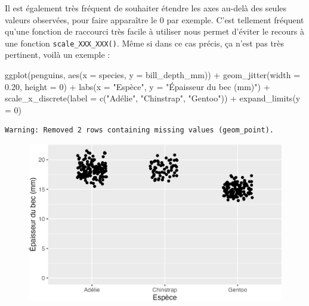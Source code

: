 \documentclass[
  letterpaper,
  DIV=11,
  numbers=noendperiod]{scrreprt}
\newenvironment{Shaded}{\begin{snugshade}}{\end{snugshade}}
\newcommand{\AttributeTok}[1]{\textcolor[rgb]{0.40,0.45,0.13}{#1}}
\newcommand{\DecValTok}[1]{\textcolor[rgb]{0.68,0.00,0.00}{#1}}
\newcommand{\FloatTok}[1]{\textcolor[rgb]{0.68,0.00,0.00}{#1}}
\newcommand{\FunctionTok}[1]{\textcolor[rgb]{0.28,0.35,0.67}{#1}}
\newcommand{\NormalTok}[1]{\textcolor[rgb]{0.00,0.23,0.31}{#1}}
\newcommand{\SpecialCharTok}[1]{\textcolor[rgb]{0.37,0.37,0.37}{#1}}
\newcommand{\StringTok}[1]{\textcolor[rgb]{0.13,0.47,0.30}{#1}}
\begin{document}
Il est également très fréquent de souhaiter étendre les axes au-delà des
seules valeurs observées, pour faire apparaître le 0 par exemple. C'est
tellement fréquent qu'une fonction de raccourci très facile à utiliser
nous permet d'éviter le recours à une fonction
\texttt{scale\_XXX\_XXX()}. Même si dans ce cas précis, ça n'est pas
très pertinent, voilà un exemple :

\begin{Shaded}
\begin{Highlighting}[]
\FunctionTok{ggplot}\NormalTok{(penguins, }\FunctionTok{aes}\NormalTok{(}\AttributeTok{x =}\NormalTok{ species, }\AttributeTok{y =}\NormalTok{ bill\_depth\_mm)) }\SpecialCharTok{+}
  \FunctionTok{geom\_jitter}\NormalTok{(}\AttributeTok{width =} \FloatTok{0.20}\NormalTok{, }\AttributeTok{height =} \DecValTok{0}\NormalTok{) }\SpecialCharTok{+}
  \FunctionTok{labs}\NormalTok{(}\AttributeTok{x =} \StringTok{"Espèce"}\NormalTok{, }\AttributeTok{y =} \StringTok{"Épaisseur du bec (mm)"}\NormalTok{) }\SpecialCharTok{+}
  \FunctionTok{scale\_x\_discrete}\NormalTok{(}\AttributeTok{label =} \FunctionTok{c}\NormalTok{(}\StringTok{"Adélie"}\NormalTok{, }\StringTok{"Chinstrap"}\NormalTok{, }\StringTok{"Gentoo"}\NormalTok{)) }\SpecialCharTok{+}
  \FunctionTok{expand\_limits}\NormalTok{(}\AttributeTok{y =} \DecValTok{0}\NormalTok{)}
\end{Highlighting}
\end{Shaded}

\begin{verbatim}
Warning: Removed 2 rows containing missing values (geom_point).
\end{verbatim}

\begin{figure}[H]

{\centering \includegraphics{./03-visualization_files/figure-pdf/unnamed-chunk-107-1.png}

}

\end{figure}
\end{document}
